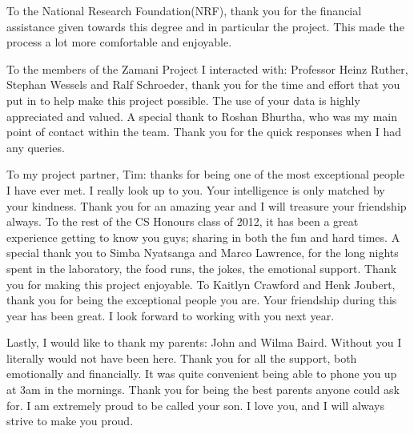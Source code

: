 \documentclass[12pt,a4paper]{report}
\begin{document}
To the National Research Foundation(NRF), thank you for the financial assistance
given towards this degree and in particular the project. This made the process
a lot more comfortable and enjoyable.

To the members of the Zamani Project I
interacted with: Professor Heinz Ruther, Stephan Wessels and Ralf Schroeder,
thank you for the time and effort that you put in to help make this project
possible. The use of your data is highly appreciated and valued. A special thank
to Roshan Bhurtha, who was my main point of contact within the team. Thank you
for the quick responses when I had any queries.

To my project partner, Tim: thanks for being one of the most exceptional people I
have ever met. I really look up to you. Your intelligence is only matched by
your kindness. Thank you for an amazing year and I will treasure your friendship
always. To the rest of the CS Honours class of 2012, it has been a great
experience getting to know you guys; sharing in both the fun and hard times.
A special thank you to Simba Nyatsanga and Marco Lawrence, for
the long nights spent in the laboratory, the food runs, the jokes, the emotional
support. Thank you for making this project enjoyable. To Kaitlyn Crawford and
Henk Joubert, thank you for being the exceptional people you are. Your friendship
during this year has been great. I look forward to working with you next year.

Lastly, I would like to thank my parents: John and Wilma Baird. Without you I
literally would not have been here. Thank you for all the support, both
emotionally and financially. It was quite convenient being able to phone you up
at 3am in the mornings. Thank you for being the best parents anyone could ask
for. I am extremely proud to be called your son. I love you, and I will always
strive to make you proud.



\tableofcontents
\newpage
\listoffigures
\newpage
{}















{}

\appendix

\end{document}

